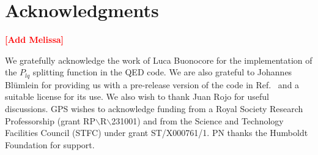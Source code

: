 \documentclass[preprint,1p,a4paper,11pt]{elsarticle}
\newcommand{\comment}[1]{\textcolor{red}{{\bf [#1]}}}
\begin{document}
\section*{Acknowledgments}

\comment{Add Melissa}

We gratefully acknowledge the work of Luca Buonocore
for the implementation of the $P_{lq}$ splitting function in the QED code.
%
We are also grateful to Johannes Bl\"umlein for providing us with a
pre-release version of the code in Ref.~\cite{BlumleinCode} and a
suitable license for its use.
%
We also wish to thank Juan Rojo for useful discussions. 
%
GPS wishes to acknowledge funding from a Royal Society Research
Professorship (grant RP$\backslash$R$\backslash$231001) and from the Science and
Technology Facilities Council (STFC) under grant ST/X000761/1.
%
PN thanks the Humboldt Foundation for support. 
%



%
\end{document}

